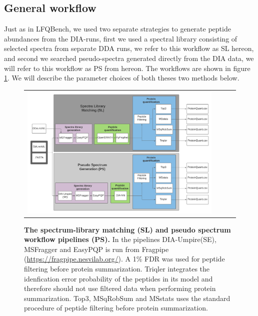 \documentclass[10pt,letterpaper]{article}
\begin{document}
\subsection*{General workflow}

Just as in LFQBench, we used two separate strategies to generate peptide abundances from the DIA-runs, first we used a spectral library consisting of selected spectra from separate DDA runs, we refer to this workflow as SL hereon, and second we searched pseudo-spectra generated directly from the DIA data, we will refer to this workflow as PS from hereon. The workflows are shown in figure \ref{fig:flowchart}. We will describe the parameter choices of both theses two methods below.

\begin{figure}[htp]
    \centering
    \begin{tabular}{lclc} 


        \includegraphics[width=1.0\linewidth]{../../result/report_plots/DIA_benchmark_truncated.png} 
    \end{tabular}
        \caption{{\bf The spectrum-library matching (SL) and pseudo spectrum workflow pipelines (PS).} In the pipelines DIA-Umpire(SE), MSFragger and EasyPQP is run from Fragpipe (\protect\url{https://fragpipe.nesvilab.org/}). A 1\% FDR was used for peptide filtering before protein summarization. Triqler integrates the idenfication error probability of the peptides in its model and therefore should not use filtered data when performing protein summarization. Top3, MSqRobSum and MSstats uses the standard procedure of peptide filtering before protein summarization.}   
      \label{fig:flowchart}
\end{figure}
\end{document}
